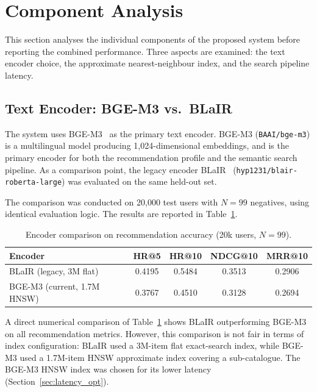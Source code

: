 \section{Component Analysis}
\label{sec:component_analysis}

This section analyses the individual components of the proposed system before reporting the combined performance.
Three aspects are examined: the text encoder choice, the approximate nearest-neighbour index, and the search pipeline latency.

\subsection{Text Encoder: BGE-M3 vs.\ BLaIR}

The system uses BGE-M3~\cite{chen2024bge} as the primary text encoder.
BGE-M3 (\texttt{BAAI/bge-m3}) is a multilingual model producing 1{,}024-dimensional embeddings, and is the primary encoder for both the recommendation profile and the semantic search pipeline.
As a comparison point, the legacy encoder BLaIR~\cite{hou2024blair} (\texttt{hyp1231/blair-roberta-large}) was evaluated on the same held-out set.

The comparison was conducted on 20{,}000 test users with $N = 99$ negatives, using identical evaluation logic.
The results are reported in Table~\ref{tab:encoder_comparison}.

\begin{table}[H]
\centering
\caption{Encoder comparison on recommendation accuracy (20k users, $N = 99$).}
\label{tab:encoder_comparison}
\begin{tabular}{lcccc}
\hline
\textbf{Encoder} & \textbf{HR@5} & \textbf{HR@10} & \textbf{NDCG@10} & \textbf{MRR@10} \\
\hline
BLaIR (legacy, 3M flat)      & 0.4195 & 0.5484 & 0.3513 & 0.2906 \\
BGE-M3 (current, 1.7M HNSW) & 0.3767 & 0.4510 & 0.3128 & 0.2694 \\
\hline
\end{tabular}
\end{table}

A direct numerical comparison of Table~\ref{tab:encoder_comparison} shows BLaIR outperforming BGE-M3 on all recommendation metrics.
However, this comparison is not fair in terms of index configuration: BLaIR used a 3M-item flat exact-search index, while BGE-M3 used a 1.7M-item HNSW approximate index covering a sub-catalogue.
The BGE-M3 HNSW index was chosen for its lower latency (Section~\ref{sec:latency_opt}).

